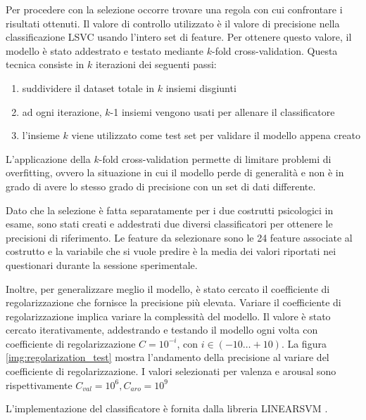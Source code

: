 Per procedere con la selezione occorre trovare una regola con cui confrontare i risultati ottenuti. Il valore di controllo utilizzato è il valore di precisione nella classificazione LSVC usando l'intero set di feature. Per ottenere questo valore, il modello è stato addestrato e testato mediante $k$-fold cross-validation. Questa tecnica consiste in $k$ iterazioni dei seguenti passi:
\begin{enumerate}
    \item suddividere il dataset totale in $k$ insiemi disgiunti
    \item ad ogni iterazione, $k$-1 insiemi vengono usati per allenare il classificatore
    \item l'insieme $k$ viene utilizzato come test set per validare il modello appena creato
\end{enumerate}
L'applicazione della $k$-fold cross-validation permette di limitare problemi di overfitting, ovvero la situazione in cui il modello perde di generalità e non è in grado di avere lo stesso grado di precisione con un set di dati differente.

Dato che la selezione è fatta separatamente per i due costrutti psicologici in esame, sono stati creati e addestrati due diversi classificatori per ottenere le precisioni di riferimento. Le feature da selezionare sono le 24 feature associate al costrutto e la variabile che si vuole predire è la media dei valori riportati nei questionari durante la sessione sperimentale.

Inoltre, per generalizzare meglio il modello, è stato cercato il coefficiente di regolarizzazione che fornisce la precisione più elevata. Variare il coefficiente di regolarizzazione implica variare la complessità del modello. Il valore è stato cercato iterativamente, addestrando e testando il modello ogni volta con coefficiente di regolarizzazione $C = 10^{-i}$, con $i\in(-10\dots+10)$. La figura \ref{img:regolarization_test} mostra l'andamento della precisione al variare del coefficiente di regolarizzazione. I valori selezionati per valenza e arousal sono rispettivamente $C_{val} = 10^{6}, C_{aro} = 10^{9}$

L'implementazione del classificatore è fornita dalla libreria LINEARSVM \cite{fan2008liblinear}.

